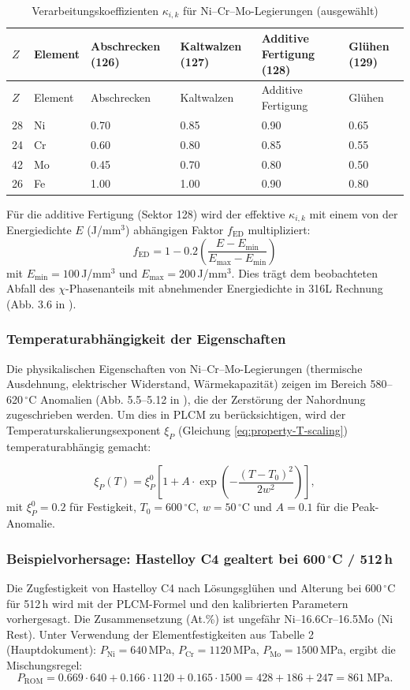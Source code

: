 \documentclass[12pt,a4paper]{article}
\begin{document}
	\begin{longtable}{p{1.5cm} p{1.2cm} p{1.8cm} p{1.8cm} p{1.8cm} p{1.8cm}}
		\caption{Verarbeitungskoeffizienten $\kappa_{i,k}$ für Ni–Cr–Mo-Legierungen (ausgewählt)}\label{tab:nicrmo_kappa_ik}\\
		\toprule
		\(Z\) & Element & Abschrecken (126) & Kaltwalzen (127) & Additive Fertigung (128) & Glühen (129) \\
		\midrule
		\endfirsthead
		\toprule
		\(Z\) & Element & Abschrecken & Kaltwalzen & Additive Fertigung & Glühen \\
		\midrule
		\endhead
		28 & Ni & 0.70 & 0.85 & 0.90 & 0.65 \\
		24 & Cr & 0.60 & 0.80 & 0.85 & 0.55 \\
		42 & Mo & 0.45 & 0.70 & 0.80 & 0.50 \\
		26 & Fe & 1.00 & 1.00 & 0.90 & 0.80 \\
		\bottomrule
	\end{longtable}
	
	Für die additive Fertigung (Sektor 128) wird der effektive $\kappa_{i,k}$ mit einem von der Energiedichte $E$ (J/mm\(^3\)) abhängigen Faktor $f_{\text{ED}}$ multipliziert:
	\[
	f_{\text{ED}} = 1 - 0.2\left(\frac{E - E_{\text{min}}}{E_{\text{max}} - E_{\text{min}}}\right)
	\]
	mit $E_{\text{min}}=100$\,J/mm\(^3\) und $E_{\text{max}}=200$\,J/mm\(^3\). Dies trägt dem beobachteten Abfall des $\chi$-Phasenanteils mit abnehmender Energiedichte in 316L Rechnung (Abb. 3.6 in \cite{dis2025}).
	
	\subsubsection{Temperaturabhängigkeit der Eigenschaften}
	Die physikalischen Eigenschaften von Ni–Cr–Mo-Legierungen (thermische Ausdehnung, elektrischer Widerstand, Wärmekapazität) zeigen im Bereich 580–620\,\(^{\circ}\)C Anomalien (Abb. 5.5–5.12 in \cite{dis2025}), die der Zerstörung der Nahordnung zugeschrieben werden. Um dies in PLCM zu berücksichtigen, wird der Temperaturskalierungsexponent $\xi_P$ (Gleichung \ref{eq:property-T-scaling}) temperaturabhängig gemacht:
	
	\[
	\xi_P(T) = \xi_P^0 \left[1 + A \cdot \exp\left(-\frac{(T-T_0)^2}{2w^2}\right)\right],
	\]
	mit $\xi_P^0 = 0.2$ für Festigkeit, $T_0 = 600$\,\(^{\circ}\)C, $w = 50$\,\(^{\circ}\)C und $A = 0.1$ für die Peak-Anomalie.
	
	\subsubsection{Beispielvorhersage: Hastelloy C4 gealtert bei 600\,\(^{\circ}\)C / 512\,h}
	Die Zugfestigkeit von Hastelloy C4 nach Lösungsglühen und Alterung bei 600\,\(^{\circ}\)C für 512\,h wird mit der PLCM-Formel und den kalibrierten Parametern vorhergesagt. Die Zusammensetzung (At.\%) ist ungefähr Ni–16.6Cr–16.5Mo (Ni Rest). Unter Verwendung der Elementfestigkeiten aus Tabelle 2 (Hauptdokument): $P_{\text{Ni}}=640$\,MPa, $P_{\text{Cr}}=1120$\,MPa, $P_{\text{Mo}}=1500$\,MPa, ergibt die Mischungsregel:
	\[
	P_{\text{ROM}} = 0.669\cdot640 + 0.166\cdot1120 + 0.165\cdot1500 = 428 + 186 + 247 = 861\ \text{MPa}.
	\]
	
\end{document}
